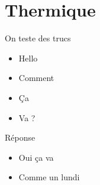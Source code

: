 \section{Thermique}
\begin{frame}{On teste des trucs}
  \begin{itemize}
    \item<1->Hello
    \item<2->Comment
    \item<3->Ça
    \item<4->Va ?
  \end{itemize}
\end{frame}

\begin{frame}{Réponse}
  \begin{itemize}
    \item Oui ça va
    \item Comme un lundi
  \end{itemize}
\end{frame}
